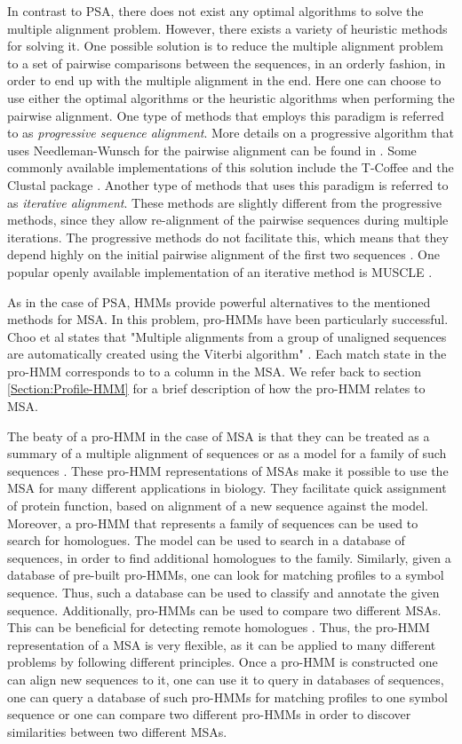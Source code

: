 \documentclass{article}\usepackage[]{graphicx}\usepackage[]{color}
\begin{document}
In contrast to PSA, there does not exist any optimal algorithms to solve the multiple alignment problem. However, there exists a variety of heuristic methods for solving it. One possible solution is to reduce the multiple alignment problem to a set of pairwise comparisons between the sequences, in an orderly fashion, in order to end up with the multiple alignment in the end. Here one can choose to use either the optimal algorithms or the heuristic algorithms when performing the pairwise alignment. One type of methods that employs this paradigm is referred to as \textit{progressive sequence alignment}. More details on a progressive algorithm that uses Needleman-Wunsch for the pairwise alignment can be found in \cite{Feng1987}. Some commonly available implementations of this solution include the T-Coffee and the Clustal package \cite{EMBL-EBI-Multiple}. Another type of methods that uses this paradigm is referred to as \textit{iterative alignment}. These methods are slightly different from the progressive methods, since they allow re-alignment of the pairwise sequences during multiple iterations. The progressive methods do not facilitate this, which means that they depend highly on the initial pairwise alignment of the first two sequences \cite{BioInfoOrgMSA}. One popular openly available implementation of an iterative method is MUSCLE \cite{EMBL-EBI-Multiple}. 

As in the case of PSA, HMMs provide powerful alternatives to the mentioned methods for MSA. In this problem, pro-HMMs have been particularly successful. Choo et al states that "Multiple alignments from a group of unaligned sequences are automatically created using the Viterbi algorithm" \cite{Choo2004}. Each match state in the pro-HMM corresponds to to a column in the MSA. We refer back to section \ref{Section:Profile-HMM} for a brief description of how the pro-HMM relates to MSA. 

The beaty of a pro-HMM in the case of MSA is that they can be treated as a summary of a multiple alignment of sequences or as a model for a family of such sequences \cite{Christianini2006}. These pro-HMM representations of MSAs make it possible to use the MSA for many different applications in biology. They facilitate quick assignment of protein function, based on alignment of a new sequence against the model. Moreover, a pro-HMM that represents a family of sequences can be used to search for homologues. The model can be used to search in a database of sequences, in order to find additional homologues to the family. Similarly, given a database of pre-built pro-HMMs, one can look for matching profiles to a symbol sequence. Thus, such a database can be used to classify and annotate the given sequence. Additionally, pro-HMMs can be used to compare two different MSAs. This can be beneficial for detecting remote homologues \cite{Yoon2009}. Thus, the pro-HMM representation of a MSA is very flexible, as it can be applied to many different problems by following different principles. Once a pro-HMM is constructed one can align new sequences to it, one can use it to query in databases of sequences, one can query a database of such pro-HMMs for matching profiles to one symbol sequence or one can compare two different pro-HMMs in order to discover similarities between two different MSAs. 
\end{document}
